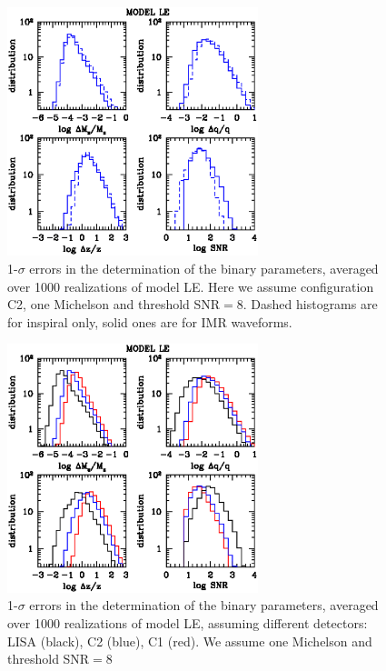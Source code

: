 \documentclass{iopart}
\begin{document}
\begin{figure}[H]
\center
   \includegraphics[width=0.65\textwidth]{FigSMBHModSel/FIG_ERRORS_C2.eps}
\caption{1-$\sigma$ errors in the determination of the binary parameters, averaged over 1000 realizations of model LE. Here we assume configuration C2, one Michelson and threshold SNR$=8$. Dashed histograms are for inspiral only, solid ones are for IMR waveforms. 
\label{F:MBHbModel:fig3} } 
\end{figure}

\begin{figure}[H]
\center
   \includegraphics[width=0.65\textwidth]{FigSMBHModSel/FIG_ERRORS_COMPARISON_81.eps}
\caption{1-$\sigma$ errors in the determination of the binary parameters, averaged over 1000 realizations of model LE, assuming different detectors: LISA (black), C2 (blue), C1 (red). We assume one Michelson and threshold SNR$=8$
\label{F:MBHbModel:fig4} } 
\end{figure}
\end{document}

